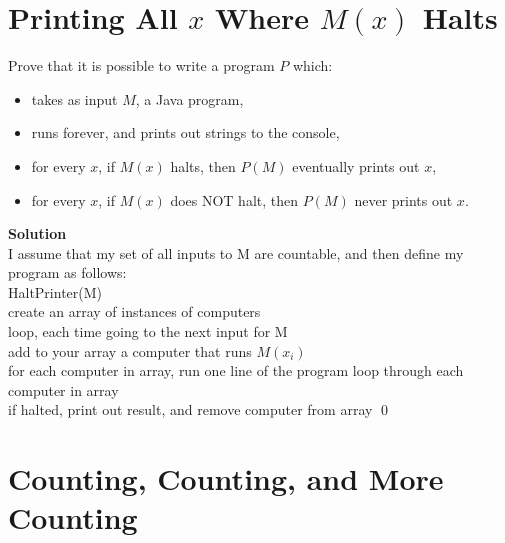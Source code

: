 \documentclass[11pt]{article}
\newcommand*{\Question}[1]{\section{#1}}
\begin{document}
 \Question{Printing All $x$ Where $M(x)$ Halts}

Prove that it is possible to write a program $P$ which:
  \begin{itemize}
  \item takes as input $M$, a Java program,
  \item runs forever, and prints out strings to the console,
  \item for every $x$, if $M(x)$ halts, then $P(M)$ eventually prints out $x$,
  \item for every $x$, if $M(x)$ does NOT halt, then $P(M)$ never prints out $x$.
  \end{itemize}

\begin{mdframed} \textbf{Solution} \\
I assume that my set of all inputs to M are countable, and then define my program as follows: \\
HaltPrinter(M) \\
create an array of instances of computers \\
loop, each time going to the next input for M \\
add to your array a computer that runs $M(x_i)$ \\
for each computer in array, run one line of the program
loop through each computer in array \\ 
if halted, print out result, and remove computer from array \qed
\end{mdframed}

\Question{Counting, Counting, and More Counting}
\end{document}
